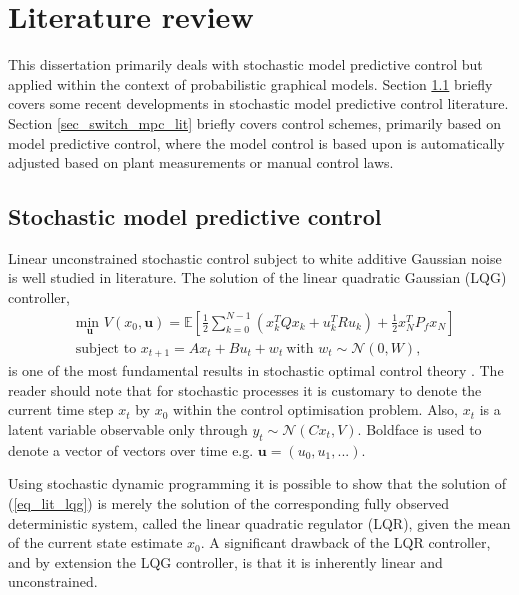 \chapter{Literature review}
\label{sec_lit_study}
This dissertation primarily deals with stochastic model predictive control but applied within the context of probabilistic graphical models. Section \ref{sec_stoch_mpc_lit} briefly covers some recent developments in stochastic model predictive control literature. Section \ref{sec_switch_mpc_lit} briefly covers control schemes, primarily  based on model predictive control, where the model control is based upon is automatically adjusted based on plant measurements or manual control laws.

\section{Stochastic model predictive control}
\label{sec_stoch_mpc_lit}
Linear unconstrained stochastic control subject to white additive Gaussian noise is well studied in literature. The solution of the linear quadratic Gaussian (LQG) controller,
\begin{equation}
\begin{aligned}
&\underset{\mathbf{u}}{\text{min }} V(x_0, \mathbf{u}) = \mathbb{E}\left[ \frac{1}{2}\sum_{k=0}^{N-1} \left( x_k^TQx_k + u_k^TRu_k \right) + \frac{1}{2}x_N^TP_fx_N \right] \\
& \text{subject to } x_{t+1}=Ax_t+Bu_t + w_t~\text{with } w_t \sim \mathcal{N}(0, W),
\end{aligned}
\label{eq_lit_lqg}
\end{equation}
is one of the most fundamental results in stochastic optimal control theory \cite{lqg}. The reader should note that for stochastic processes it is customary to denote the current time step $x_t$ by $x_0$ within the control optimisation problem. Also, $x_t$ is a latent variable observable only through $y_t \sim \mathcal{N}(Cx_t, V)$. Boldface is used to denote a vector of vectors over time e.g. $\mathbf{u}=(u_0, u_1,...)$.

Using stochastic dynamic programming it is possible to show that the solution of (\ref{eq_lit_lqg}) is merely the solution of the corresponding fully observed deterministic system, called the linear quadratic regulator (LQR), given the mean of the current state estimate $x_0$. A significant drawback of the LQR controller, and by extension the LQG controller, is that it is inherently linear and unconstrained.

